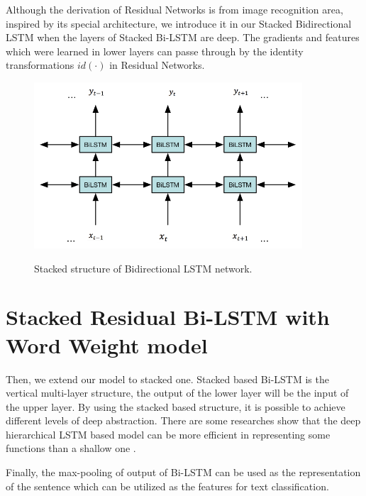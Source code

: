 \documentclass[senior]{IPSstyle}
\begin{document}
Although the derivation of Residual Networks is from image recognition area, inspired by its special architecture, we introduce it in our Stacked Bidirectional LSTM when the layers of Stacked Bi-LSTM are deep. The gradients and features which were learned in lower layers can passe through by the identity transformations $id(\cdot)$ in Residual Networks.




\begin{figure}[t]
  \centering
  \includegraphics[width=10cm]{stacked.png}\\
  \caption{Stacked structure of Bidirectional LSTM network.}\label{NBde}
\end{figure}

\section{Stacked Residual Bi-LSTM with Word Weight model}

Then, we extend our model to stacked one. Stacked based Bi-LSTM is the vertical multi-layer structure, the output of the lower layer will be the input of the upper layer. By using the stacked based structure, it is possible to achieve different levels of deep abstraction. There are some researches show that the deep hierarchical LSTM based model can be more efficient in representing some functions than a shallow one \cite{graves2013speech}\cite{chung2015gated}.

Finally, the max-pooling of output of Bi-LSTM can be used as the representation of the sentence which can be utilized as the features for text classification.
\end{document}
